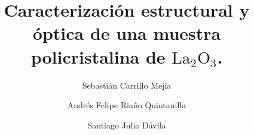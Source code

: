 \documentclass[final,5p,times,twocolumn, nopreprintline]{elsarticle}
\numberwithin{equation}{section}
\begin{document}
\begin{frontmatter}



\title{Caracterización estructural y óptica de una muestra policristalina de $\text{La}_2\text{O}_3$.}


\author[first]{Sebastián Carrillo Mejía}

\author[first]{Andrés Felipe Riaño Quintanilla}


\author[first]{Santiago Julio Dávila}





\begin{abstract}

\end{abstract}

\begin{keyword}

\end{keyword}

\end{frontmatter}
\end{document}
